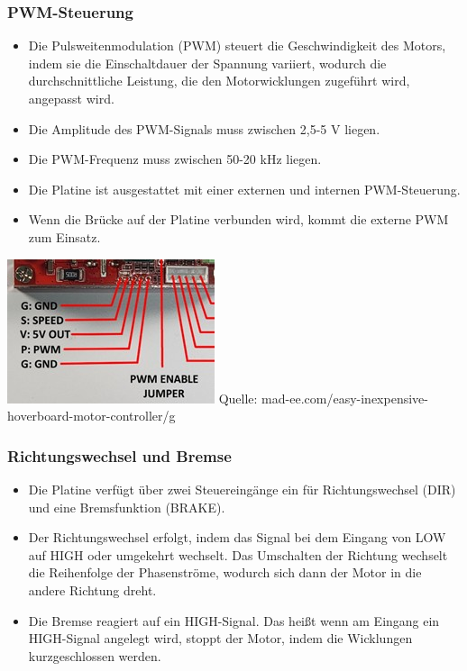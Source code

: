 \documentclass[ngerman,12pt,a4paper]{article}
\begin{document}
		\subsubsection*{PWM-Steuerung}
		\begin{itemize}
			\item Die Pulsweitenmodulation (PWM) steuert die Geschwindigkeit des Motors, indem sie die Einschaltdauer der Spannung variiert, wodurch die durchschnittliche Leistung, die den Motorwicklungen zugeführt wird, angepasst wird.
			\item Die Amplitude des PWM-Signals muss zwischen 2,5-5 V liegen.
			\item Die PWM-Frequenz muss zwischen 50-20 kHz liegen.
			\item Die Platine ist ausgestattet mit einer externen und internen PWM-Steuerung.
			\item Wenn die Brücke auf der Platine verbunden wird, kommt die externe PWM zum Einsatz.
		\end{itemize}
		
		\begin{center}
			\begin{minipage}{\textwidth}
				\centering
				\includegraphics[scale=1]{Pictures/PWM-Treiber}
				\label{fig:spiffs_init}
				\vspace{-2pt}
				\small Quelle: mad-ee.com/easy-inexpensive-hoverboard-motor-controller/g
			\end{minipage}
		\end{center}
		\newpage
		\subsubsection*{Richtungswechsel und Bremse}
		\begin{itemize}
			\item Die Platine verfügt über zwei Steuereingänge ein für Richtungswechsel (DIR) und eine Bremsfunktion (BRAKE).
			\item Der Richtungswechsel erfolgt, indem das Signal bei dem Eingang von LOW auf HIGH oder umgekehrt wechselt. Das Umschalten der Richtung wechselt die Reihenfolge der Phasenströme, wodurch sich dann der Motor in die andere Richtung dreht.
			\item Die Bremse reagiert auf ein HIGH-Signal. Das heißt wenn am Eingang ein HIGH-Signal angelegt wird, stoppt der Motor, indem die Wicklungen kurzgeschlossen werden.
		\end{itemize}
		
\end{document}
